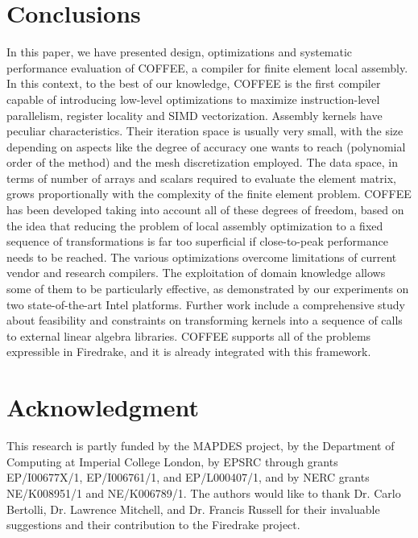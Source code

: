 \documentclass[conference]{IEEEtran}
\begin{document}
\section{Conclusions}
\label{sec:conclusions}

In this paper, we have presented design, optimizations and systematic performance evaluation of COFFEE, a compiler for finite element local assembly. In this context, to the best of our knowledge, COFFEE is the first compiler capable of introducing low-level optimizations to maximize instruction-level parallelism, register locality and SIMD vectorization. Assembly kernels have peculiar characteristics. Their iteration space is usually very small, with the size depending on aspects like the degree of accuracy one wants to reach (polynomial order of the method) and the mesh discretization employed. The data space, in terms of number of arrays and scalars required to evaluate the element matrix, grows proportionally with the complexity of the finite element problem. COFFEE has been developed taking into account all of these degrees of freedom, based on the idea that reducing the problem of local assembly optimization to a fixed sequence of transformations is far too superficial if close-to-peak performance needs to be reached. The various optimizations overcome limitations of current vendor and research compilers. The exploitation of domain knowledge allows some of them to be particularly effective, as demonstrated by our experiments on two state-of-the-art Intel platforms. Further work include a comprehensive study about feasibility and constraints on transforming kernels into a sequence of calls to external linear algebra libraries. COFFEE supports all of the problems expressible in Firedrake, and it is already integrated with this framework.



\section*{Acknowledgment}

This research is partly funded by the MAPDES project, by the Department of Computing at Imperial College London, by EPSRC through grants EP/I00677X/1, EP/I006761/1, and EP/L000407/1, and by NERC grants NE/K008951/1 and NE/K006789/1. The authors would like to thank Dr. Carlo Bertolli, Dr. Lawrence Mitchell, and Dr. Francis Russell for their invaluable suggestions and their contribution to the Firedrake project.






\end{document}
